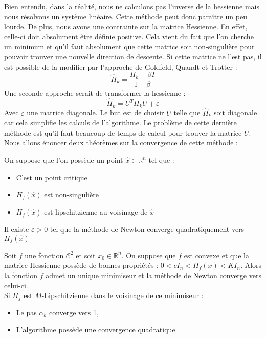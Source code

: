 Bien entendu, dans la réalité, nous ne calculons pas l'inverse de la hessienne mais nous résolvons un système linéaire. Cette méthode peut donc paraître un peu lourde. De plus, nous avons une contrainte sur la matrice Hessienne. En effet, celle-ci doit absolument être définie positive. Cela vient du fait que l'on cherche un minimum et qu'il faut absolument que cette matrice soit non-singulière pour pouvoir trouver une nouvelle direction de descente. Si cette matrice ne l'est pas, il est possible de la modifier par l'approche de Goldfeld, Quandt et Trotter : 
\begin{equation}
\hat{H}_k = \frac{H_k + \beta I}{1 + \beta}
\end{equation}
Une seconde approche serait de transformer la hessienne  : 
\begin{equation}
\hat{H}_k = U^TH_kU + \varepsilon
\end{equation}
Avec $\varepsilon$ une matrice diagonale. Le but est de choisir $U$ telle que $\hat{H}_k$ soit diagonale car cela simplifie les calculs de l'algorithme. Le problème de cette dernière méthode est qu'il faut beaucoup de temps de calcul pour trouver la matrice $U$.\\

Nous allons énoncer deux théorèmes sur la convergence de cette méthode : 

\begin{theoreme}
  On suppose que l'on possède un point $\hat{x} \in \mathbb{R}^n$ tel que : 
\begin{itemize}
	\item C'est un point critique
	\item $H_f(\hat{x})$ est non-singulière
	\item $H_f(\hat{x})$ est lipschitzienne au voisinage de $\hat{x}$
\end{itemize}
Il existe $\varepsilon > 0$ tel que la méthode de Newton converge quadratiquement vers $H_f(\hat{x})$
\end{theoreme}

\begin{theoreme}
Soit $f$ une fonction $\mathcal{C}^2$ et soit $x_0 \in \mathbb{R}^n$. On suppose que $f$ est convexe et que la matrice Hessienne possède de bonnes propriétés :  $ 0 < cI_n < H_f(x) < KI_n$. Alors la fonction $f$ admet un unique minimiseur et la méthode de Newton converge vers celui-ci.\\
Si $H_f$ est $M$-Lipschitzienne dans le voisinage de ce minimiseur : 
\begin{itemize}
	\item Le pas $\alpha_k$ converge vers 1,
	\item L'algorithme possède une convergence quadratique.
\end{itemize}
\end{theoreme}

